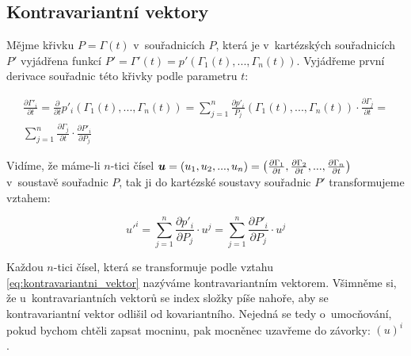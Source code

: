  

\subsection{Kontravariantní vektory}

Mějme křivku \(P = \Gamma(t)\) v~souřadnicích \(P\), která je v~kartézských souřadnicích \(P'\) vyjádřena funkcí \(P' = \Gamma'(t) = p'(\Gamma_1(t), ..., \Gamma_n(t))\). Vyjádřeme první derivace souřadnic této křivky podle parametru \(t\):

\begin{equation}
\begin{split}
\frac{\partial \Gamma'_i}{\partial t} = \frac{\partial}{\partial t} p'_i(\Gamma_1(t), ..., \Gamma_n(t)) = \sum_{j=1}^n \frac{\partial p'_i}{P_j} (\Gamma_1(t), ..., \Gamma_n(t)) \cdot \frac{\partial \Gamma_j}{\partial t} = \\
\sum_{j=1}^n \frac{\partial \Gamma_j}{\partial t} \cdot \frac{\partial P'_i}{\partial P_j}
\end{split}
\end{equation}

Vidíme, že máme-li \(n\)-tici čísel \(\boldsymbol{u} = (u_1, u_2, ..., u_n) = \left( \frac{\partial \Gamma_1}{\partial t}, \frac{\partial \Gamma_2}{\partial t}, ..., \frac{\partial \Gamma_n}{\partial t} \right)\) v~soustavě souřadnic \(P\), tak ji do kartézské soustavy souřadnic \(P'\) transformujeme vztahem:

\begin{equation}
\label{eq:kontravariantni_vektor}
u'^i = \sum_{j=1}^n \frac{\partial p'_i}{\partial P_j} \cdot u^j = \sum_{j=1}^n \frac{\partial P'_i}{\partial P_j} \cdot u^j
\end{equation}

Každou \(n\)-tici čísel, která se transformuje podle vztahu \eqref{eq:kontravariantni_vektor} nazýváme kontravariantním vektorem. Všimněme si, že u~kontravariantních vektorů se index složky píše nahoře, aby se kontravariantní vektor odlišil od kovariantního. Nejedná se tedy o~umocňování, pokud bychom chtěli zapsat mocninu, pak mocněnec uzavřeme do závorky: \((u)^i\).

